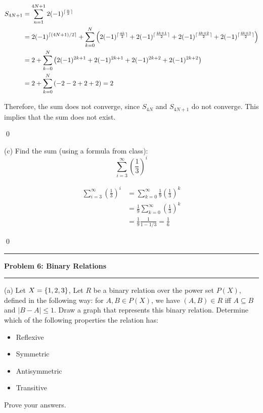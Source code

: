 \documentclass[11pt]{article}
\DeclarePairedDelimiter{\ceil}{\lceil}{\rceil}
\newcommand\question[2]{\vspace{.25in}\hrule\textbf{#1: #2}\vspace{.5em}\hrule\vspace{.10in}}
\begin{document}
\begin{align*}
    S_{4N+1} &= \sum_{n=1}^{4N+1} 2(-1)^{\ceil{\frac{n}{2}}}\\
      &= 2(-1)^{\ceil{(4N+1)/2}} + \sum_{k=0}^{N} \left(2(-1)^{\ceil{\frac{4k}{2}}} + 2(-1)^{\ceil{\frac{4k+1}{2}}} + 2(-1)^{\ceil{\frac{4k+2}{2}}} + 2(-1)^{\ceil{\frac{4k+3}{2}}}\right)\\
      &= 2 + \sum_{k=0}^{N} \left(2(-1)^{2k+1} + 2(-1)^{2k+1} + 2(-1)^{2k+2} + 2(-1)^{2k+2}\right)\\
      &= 2 + \sum_{k=0}^{N} \left(-2 - 2 + 2 + 2\right) = 2\\
\end{align*}

Therefore, the sum does not converge, since $S_{4N}$ and $S_{4N+1}$ do not converge. This implies that the sum does not exist.

\qed

(c)  Find the sum (using a formula from class):
\begin{equation}
    \sum_{i=3}^{\infty} \left(\frac{1}{3}\right)^i
\end{equation}

\solution

\begin{align*}
    \sum_{i=3}^{\infty} \left(\frac{1}{3}\right)^i
    &= \sum_{k=0}^{\infty} \frac{1}{9}\left(\frac{1}{3}\right)^k\\
    &= \frac{1}{9}\sum_{k=0}^{\infty} \left(\frac{1}{3}\right)^k\\
    &= \frac{1}{9}\frac{1}{1-1/3} = \frac{1}{6}
\end{align*}

\qed

\question{Problem 6}{Binary Relations}

(a) Let $X = \{1,2,3\}$, Let $R$ be a binary relation over the power set $P(X)$, defined in the following way: for $A, B\in P(X)$, we have $(A, B)\in R$ iff $A\subseteq B$ and $|B-A|\le 1$.
Draw a graph that represents this binary relation. Determine which of the following properties the relation has:
\begin{itemize}
    \item Reflexive
    \item Symmetric
    \item Antisymmetric
    \item Transitive
\end{itemize}
Prove your answers.

\solution
\end{document}
